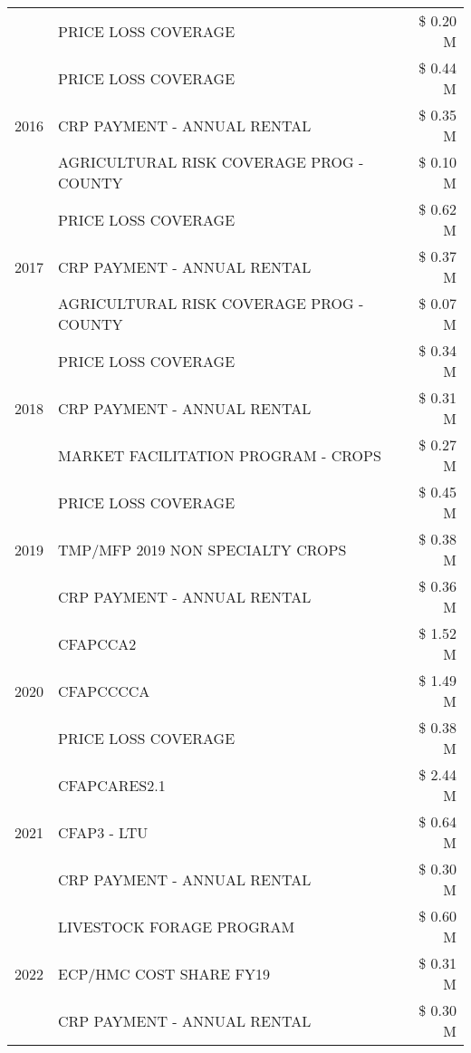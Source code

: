 \begin{tabular}{llr}
 & PRICE LOSS COVERAGE & \$ 0.20 M \\
\cline{1-3}
\multirow[t]{3}{*}{2016} & PRICE LOSS COVERAGE & \$ 0.44 M \\
 & CRP PAYMENT - ANNUAL RENTAL & \$ 0.35 M \\
 & AGRICULTURAL RISK COVERAGE PROG - COUNTY & \$ 0.10 M \\
\cline{1-3}
\multirow[t]{3}{*}{2017} & PRICE LOSS COVERAGE & \$ 0.62 M \\
 & CRP PAYMENT - ANNUAL RENTAL & \$ 0.37 M \\
 & AGRICULTURAL RISK COVERAGE PROG - COUNTY & \$ 0.07 M \\
\cline{1-3}
\multirow[t]{3}{*}{2018} & PRICE LOSS COVERAGE & \$ 0.34 M \\
 & CRP PAYMENT - ANNUAL RENTAL & \$ 0.31 M \\
 & MARKET FACILITATION PROGRAM - CROPS & \$ 0.27 M \\
\cline{1-3}
\multirow[t]{3}{*}{2019} & PRICE LOSS COVERAGE & \$ 0.45 M \\
 & TMP/MFP 2019 NON SPECIALTY CROPS & \$ 0.38 M \\
 & CRP PAYMENT - ANNUAL RENTAL & \$ 0.36 M \\
\cline{1-3}
\multirow[t]{3}{*}{2020} & CFAPCCA2 & \$ 1.52 M \\
 & CFAPCCCCA & \$ 1.49 M \\
 & PRICE LOSS COVERAGE & \$ 0.38 M \\
\cline{1-3}
\multirow[t]{3}{*}{2021} & CFAPCARES2.1 & \$ 2.44 M \\
 & CFAP3 - LTU & \$ 0.64 M \\
 & CRP PAYMENT - ANNUAL RENTAL & \$ 0.30 M \\
\cline{1-3}
\multirow[t]{3}{*}{2022} & LIVESTOCK FORAGE PROGRAM & \$ 0.60 M \\
 & ECP/HMC COST SHARE FY19 & \$ 0.31 M \\
 & CRP PAYMENT - ANNUAL RENTAL & \$ 0.30 M \\
\cline{1-3}
\bottomrule
\end{tabular}
